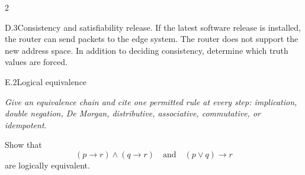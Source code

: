 \documentclass[9pt]{extarticle}
\begin{document}
\begin{multicols}{2}
\begin{CoreProblem}{D.3}{Consistency and satisfiability}
release. If the latest software release is installed, the router can send
packets to the edge system. The router does not support the new address space.
In addition to deciding consistency, determine which truth values are forced.
\end{CoreProblem}
\begin{CoreProblem}{E.2}{Logical equivalence}
{\scriptsize\textit{Give an equivalence chain and cite one permitted rule at every step: implication, double negation, De Morgan, distributive, associative, commutative, or idempotent.}\par}
Show that
\[
  (p\to r)\land(q\to r)
  \quad\text{and}\quad
  (p\lor q)\to r
\]
are logically equivalent.
\end{CoreProblem}
\end{multicols}
\CoreWorkArea
\FormBreak
{}
\end{document}
